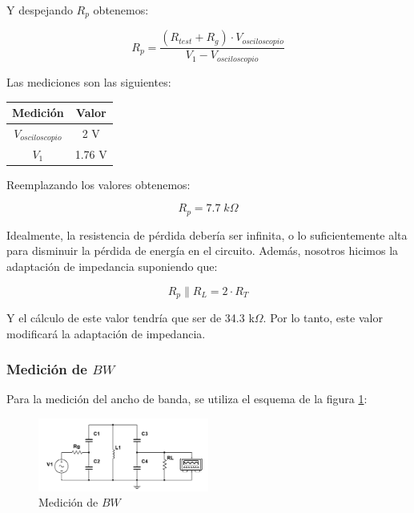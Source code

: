 Y despejando $R_p$ obtenemos:

\begin{equation}
    R_p = \frac{(R_{test} + R_g) \cdot V_{osciloscopio}}{V_{1} - V_{osciloscopio}}
\end{equation}

Las mediciones son las siguientes:



\begin{table}[H]
    \centering
    \begin{tabular}{|c|c|}
    \hline
    \rowcolor[HTML]{C0C0C0} 
    \textbf{Medición} & \textbf{Valor} \\ \hline
    $V_{osciloscopio}$            & 2 V         \\ \hline
    $V_{1}$         & 1.76 V         \\ \hline
    \end{tabular}
\end{table}

Reemplazando los valores obtenemos:

\begin{equation}
    \boxed{R_p = 7.7\; k\Omega}
\end{equation}

Idealmente, la resistencia de pérdida debería ser infinita, o lo suficientemente alta para disminuir la pérdida de energía en el circuito. Además, nosotros hicimos la adaptación
de impedancia suponiendo que:

\begin{equation}
    R_p \parallel R_L = 2 \cdot R_T
\end{equation}

Y el cálculo de este valor tendría que ser de 34.3 k$\Omega$. Por lo tanto, este valor modificará la adaptación de impedancia. 

\subsubsection{Medición de $BW$}

Para la medición del ancho de banda, se utiliza el esquema de la figura \ref{fig: de la medición del ancho de banda}:

\begin{figure}[h]
    \centering
    \includegraphics[width=0.5\textwidth]{Imagenes/medicion_bw.png}
    \caption{Medición de $BW$}
    \label{fig: de la medición del ancho de banda}
\end{figure}

